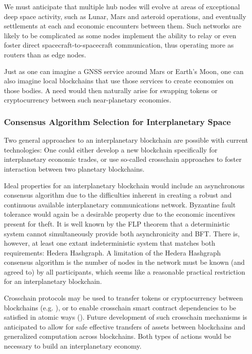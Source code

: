 \documentclass[]{aiaa-tc}%
\begin{document}
We must anticipate that multiple hub nodes will evolve at areas of exceptional deep space activity, such as Lunar, Mars and asteroid operations, and eventually settlements at each and economic encounters between them. Such networks are likely to be complicated as some nodes implement the ability to relay or even foster direct spacecraft-to-spacecraft communication, thus operating more as routers than as edge nodes.

Just as one can imagine a GNSS service around Mars or Earth's Moon, one can also imagine local blockchains that use those services to create economies on those bodies. A need would then naturally arise for swapping tokens or cryptocurrency between such near-planetary economies.

\subsubsection{Consensus Algorithm Selection for Interplanetary Space}

Two general approaches to an interplanetary blockchain are possible with current technologies: One could either develop a new blockchain specifically for interplanetary economic trades, or use so-called crosschain approaches to foster interaction between two planetary blockchains.

Ideal properties for an interplanetary blockchain would include an asynchronous consensus algorithm due to the difficulties inherent in creating a robust and continuous available interplanetary communications network. Byzantine fault tolerance would again be a desirable property due to the economic incentives present for theft. It is well known by the FLP theorem\cite{fischer1982impossibility} that a deterministic system cannot simultaneously provide both asynchronicity and BFT. There is, however, at least one extant indeterministic system that matches both requirements: Hedera Hashgraph\cite{baird2018hedera}. A limitation of the Hedera Hashgraph consensus algorithm is the number of nodes in the network must be known (and agreed to) by all participants, which seems like a reasonable practical restriction for an interplanetary blockchain.

Crosschain protocols may be used to transfer tokens or cryptocurrency between blockchains (e.g. \cite{thomas2015protocol,sporny-web-ledger-2019}), or to enable crosschain smart contract dependencies to be satisfied in atomic ways (\cite{robinson2019atomic}). Future development of such crosschain mechanisms is anticipated to allow for safe effective transfers of assets between blockchains and generalized computation across blockchains. Both types of actions would be necessary to build an interplanetary economy.
\end{document}
